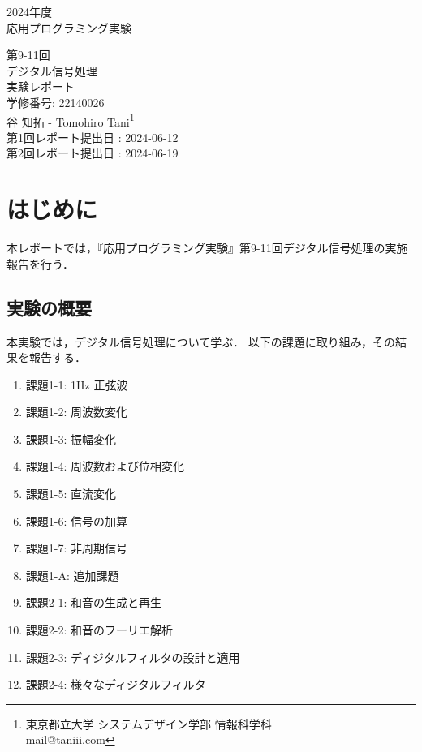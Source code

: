 \documentclass[fleqn, a4paper. 12pt]{jsarticle}
\begin{document}
  \begin{titlepage}
    \begin{center}
      {\Huge 2024年度\\応用プログラミング実験}
      
      \vspace{4cm}
      {\Huge 第9-11回\\デジタル信号処理\\
        実験レポート\\
      }
      \vspace{4cm}
      {\large 学修番号: 22140026\\谷 知拓 - Tomohiro Tani\footnote{東京都立大学 システムデザイン学部 情報科学科 \\ mail@taniii.com} \\}
      \vspace{0.5cm}
      {\large
        第1回レポート提出日 : 2024-06-12 \\
        第2回レポート提出日 : 2024-06-19 \\
      }
    \end{center}
  \end{titlepage}

  \section*{はじめに}

    本レポートでは，『応用プログラミング実験』第9-11回デジタル信号処理の実施報告を行う．

  \subsection*{実験の概要}

    本実験では，デジタル信号処理について学ぶ．
    以下の課題に取り組み，その結果を報告する．

    \begin{enumerate}
      \item 課題1-1: 1Hz 正弦波
      \item 課題1-2: 周波数変化
      \item 課題1-3: 振幅変化
      \item 課題1-4: 周波数および位相変化
      \item 課題1-5: 直流変化
      \item 課題1-6: 信号の加算
      \item 課題1-7: 非周期信号
      \item 課題1-A: 追加課題
      \item 課題2-1: 和音の生成と再生
      \item 課題2-2: 和音のフーリエ解析
      \item 課題2-3: ディジタルフィルタの設計と適用
      \item 課題2-4: 様々なディジタルフィルタ
    \end{enumerate}
\end{document}

